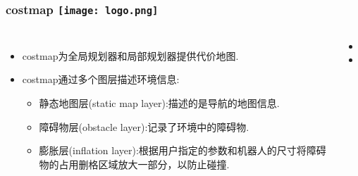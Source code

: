 \begin{comment}
\end{comment}
\begin{frame}
\frametitle{costmap \hfill \texttt{[image: logo.png]}}
\begin{columns}
	\begin{itemize}
		\item costmap为全局规划器和局部规划器提供代价地图.
		\vspace{0.2cm}
		\item costmap通过多个图层描述环境信息:
		\begin{itemize}
			\item 静态地图层(static map layer):描述的是导航的地图信息.
			\item 障碍物层(obstacle layer):记录了环境中的障碍物.
			\item 膨胀层(inflation layer):根据用户指定的参数和机器人的尺寸将障碍物的占用删格区域放大一部分，以防止碰撞.
		\end{itemize}
	\end{itemize}
	\begin{itemize}
		\item 
		\vspace{0.5cm}
		\item
	\end{itemize}
\end{columns}
\end{frame}


